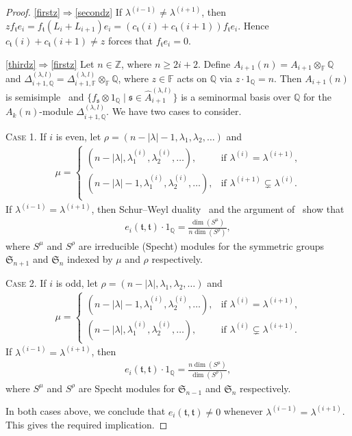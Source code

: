 \documentclass[11pt,a4paper,reqno,svgnames]{amsart}
\theoremstyle{plain}
\theoremstyle{definition}
\numberwithin{equation}{section}
\begin{document}
\begin{proof} 
\eqref{firstz}$\Rightarrow$\eqref{secondz} If  $\lambda^{(i-1)}\ne \lambda^{(i+1)}$, then  $zf_\mathfrak{t}e_i=f_\mathfrak{t}(L_i+L_{i+1})e_i =(c_\mathfrak{t}(i)+c_\mathfrak{t}(i+1)) f_\mathfrak{t}e_i$. Hence $c_\mathfrak{t}(i)+c_\mathfrak{t}(i+1)\ne z$ forces that $f_\mathfrak{t}e_i=0$. 

\eqref{thirdz}$\Rightarrow$\eqref{firstz} Let $n\in\mathbb{Z}$, where $n{\geqslant} 2i+2$. Define $A_{i+1}(n)=A_{i+1}\otimes_\mathbb{F}\mathbb{Q}$ and $\Delta_{i+1,\mathbb{Q}}^{(\lambda,l)}=\Delta_{i+1,\mathbb{F}}^{(\lambda,l)}\otimes_\mathbb{F} \mathbb{Q}$, where $z\in \mathbb{F}$ acts on $\mathbb{Q}$ via $z\cdot 1_\mathbb{Q}=n$. Then $A_{i+1}(n)$ is semisimple~\cite[Theorem~3.27]{MR2143201} and $\lbrace f_\mathfrak{s}\otimes 1_\mathbb{Q} \mid\mathfrak{s}\in \hat{A}_{i+1}^{(\lambda,l)}\rbrace$ is a seminormal basis over $\mathbb{Q}$ for the $A_k(n)$-module $\Delta_{i+1,\mathbb{Q}}^{(\lambda,l)}$. We have two cases to consider. 

{\textsc{Case 1.}} If $i$ is even, let $\rho=(n-|\lambda|-1,\lambda_1,\lambda_2,\ldots)$ and 
\begin{align*}
\mu=\begin{cases}
(n-|\lambda|,\lambda^{(i)}_1,\lambda^{(i)}_2,\ldots), &\text{if $\lambda^{(i)}=\lambda^{(i+1)}$,}\\
(n-|\lambda|-1,\lambda^{(i)}_1,\lambda^{(i)}_2,\ldots), &\text{if $\lambda^{(i+1)}\subsetneq\lambda^{(i)}$.}\\
\end{cases}
\end{align*} 
If $\lambda^{(i-1)}=\lambda^{(i+1)}$,  then Schur--Weyl duality~\cite[Theorem~3.32]{MR2143201} and the argument of~\cite[Lemma~3.5]{MR1398116} show that 
\begin{align*}
e_i(\mathfrak{t,t})\cdot 1_\mathbb{Q}=\frac{\dim(S^\mu)}{n \dim(S^\rho)},
\end{align*}
where $S^\mu$ and $S^\rho$ are irreducible (Specht) modules for the symmetric groups $\mathfrak{S}_{n+1}$ and $\mathfrak{S}_n$ indexed by $\mu$ and $\rho$ respectively. 

{\textsc{Case 2.}} If $i$ is odd, let $\rho=(n-|\lambda|,\lambda_1,\lambda_2, \ldots)$ and 
\begin{align*}
\mu=
\begin{cases}
(n-|\lambda|-1,\lambda^{(i)}_1,\lambda^{(i)}_2,\ldots),&\text{if $\lambda^{(i)}=\lambda^{(i+1)}$,}\\
(n-|\lambda|,\lambda^{(i)}_1,\lambda^{(i)}_2,\ldots), &\text{if $\lambda^{(i)}\subsetneq\lambda^{(i+1)}$.}
\end{cases}
\end{align*} 
If $\lambda^{(i-1)}=\lambda^{(i+1)}$, then
\begin{align*}
e_i(\mathfrak{t,t})\cdot1_\mathbb{Q}=\frac{n\dim(S^\mu)}{\dim(S^\rho)},
\end{align*}
where $S^\mu$ and $S^\rho$ are Specht modules for $\mathfrak{S}_{n-1}$ and $\mathfrak{S}_n$ respectively.

In both cases above, we conclude that $e_i(\mathfrak{t,t})\ne0$ whenever $\lambda^{(i-1)}=\lambda^{(i+1)}$. This gives the required implication. 
\end{proof}
\end{document}
